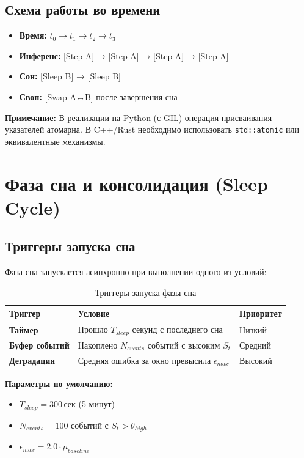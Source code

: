 \subsection{Схема работы во времени}

\begin{itemize}
    \item \textbf{Время:} $t_0 \rightarrow t_1 \rightarrow t_2 \rightarrow t_3$
    \item \textbf{Инференс:} [Step A] → [Step A] → [Step A] → [Step A]
    \item \textbf{Сон:} [Sleep B] → [Sleep B]
    \item \textbf{Своп:} [Swap A↔B] после завершения сна
\end{itemize}

\textbf{Примечание:} В реализации на Python (с GIL) операция присваивания указателей атомарна. В C++/Rust необходимо использовать \texttt{std::atomic} или эквивалентные механизмы.

\section{Фаза сна и консолидация (Sleep Cycle)}

\subsection{Триггеры запуска сна}

Фаза сна запускается асинхронно при выполнении одного из условий:

\begin{table}[h]
\centering
\caption{Триггеры запуска фазы сна}
\label{tab:sleep_triggers}
\begin{tabular}{lp{6cm}l}
\toprule
\textbf{Триггер} & \textbf{Условие} & \textbf{Приоритет} \\
\midrule
\textbf{Таймер} & Прошло $T_{sleep}$ секунд с последнего сна & Низкий \\
\textbf{Буфер событий} & Накоплено $N_{events}$ событий с высоким $S_t$ & Средний \\
\textbf{Деградация} & Средняя ошибка за окно превысила $\epsilon_{max}$ & Высокий \\
\bottomrule
\end{tabular}
\end{table}

\textbf{Параметры по умолчанию:}
\begin{itemize}
    \item $T_{sleep} = 300 \, \text{сек}$ (5 минут)
    \item $N_{events} = 100$ событий с $S_t > \theta_{high}$
    \item $\epsilon_{max} = 2.0 \cdot \mu_{baseline}$
\end{itemize}


